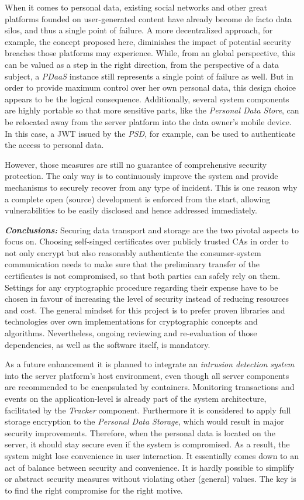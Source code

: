 \documentclass[12pt,english,a4paper,titlepage,cleardoublepage=empty,dottedtoc]{report}
\begin{document}
When it comes to personal data, existing social networks and other great
platforms founded on user-generated content have already become de facto
data silos, and thus a single point of failure. A more decentralized
approach, for example, the concept proposed here, diminishes the impact
of potential security breaches those platforms may experience. While,
from an global perspective, this can be valued as a step in the right
direction, from the perspective of a data subject, a \emph{PDaaS}
instance still represents a single point of failure as well. But in
order to provide maximum control over her own personal data, this design
choice appears to be the logical consequence. Additionally, several
system components are highly portable so that more sensitive parts, like
the \emph{Personal Data Store}, can be relocated away from the server
platform into the data owner's mobile device. In this case, a JWT issued
by the \emph{PSD}, for example, can be used to authenticate the access
to personal data.

However, those measures are still no guarantee of comprehensive security
protection. The only way is to continuously improve the system and
provide mechanisms to securely recover from any type of incident. This
is one reason why a complete open (source) development is enforced from
the start, allowing vulnerabilities to be easily disclosed and hence
addressed immediately.

\emph{\textbf{Conclusions:}} Securing data transport and storage are the
two pivotal aspects to focus on. Choosing self-singed certificates over
publicly trusted CAs in order to not only encrypt but also reasonably
authenticate the consumer-system communication needs to make sure that
the preliminary transfer of the certificates is not compromised, so that
both parties can safely rely on them. Settings for any cryptographic
procedure regarding their expense have to be chosen in favour of
increasing the level of security instead of reducing resources and cost.
The general mindset for this project is to prefer proven libraries and
technologies over own implementations for cryptographic concepts and
algorithms. Nevertheless, ongoing reviewing and re-evaluation of those
dependencies, as well as the software itself, is mandatory.

As a future enhancement it is planned to integrate an \emph{intrusion
detection system} into the server platform's host environment, even
though all server components are recommended to be encapsulated by
containers. Monitoring transactions and events on the application-level
is already part of the system architecture, facilitated by the
\emph{Tracker} component. Furthermore it is considered to apply full
storage encryption to the \emph{Personal Data Storage}, which would
result in major security improvements. Therefore, when the personal data
is located on the server, it should stay secure even if the system is
compromised. As a result, the system might lose convenience in user
interaction. It essentially comes down to an act of balance between
security and convenience. It is hardly possible to simplify or abstract
security measures without violating other (general) values. The key is
to find the right compromise for the right motive.
\end{document}
